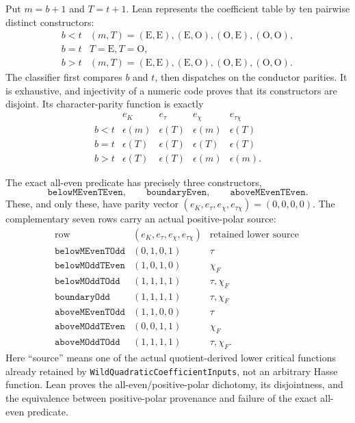 \begin{definition}\label{mod:cases-wildquadratic-coefficienttable}
Put \(m=b+1\) and \(T=t+1\).  Lean represents the coefficient table by ten
pairwise distinct constructors:
\[
\begin{array}{c|c}
b<t&(m,T)=(\mathrm E,\mathrm E),(\mathrm E,\mathrm O),
       (\mathrm O,\mathrm E),(\mathrm O,\mathrm O),\\
b=t&T=\mathrm E,T=\mathrm O,\\
b>t&(m,T)=(\mathrm E,\mathrm E),(\mathrm E,\mathrm O),
       (\mathrm O,\mathrm E),(\mathrm O,\mathrm O).
\end{array}
\]
The classifier first compares \(b\) and \(t\), then dispatches on the
conductor parities.  It is exhaustive, and injectivity of a numeric code
proves that its constructors are disjoint.  Its character-parity function is
exactly
\[
\begin{array}{c|cccc}
 &e_K&e_\tau&e_\chi&e_{\tau\chi}\\ \hline
b<t&\epsilon(m)&\epsilon(T)&\epsilon(m)&\epsilon(T)\\
b=t&\epsilon(T)&\epsilon(T)&\epsilon(T)&\epsilon(T)\\
b>t&\epsilon(T)&\epsilon(T)&\epsilon(m)&\epsilon(m).
\end{array}
\]

The exact all-even predicate has precisely three constructors,
\[
 \texttt{belowMEvenTEven},\qquad
 \texttt{boundaryEven},\qquad
 \texttt{aboveMEvenTEven}.
\]
These, and only these, have parity vector
\((e_K,e_\tau,e_\chi,e_{\tau\chi})=(0,0,0,0)\).  The complementary seven
rows carry an actual positive-polar source:
\[
\begin{array}{c|c|c}
\text{row}&(e_K,e_\tau,e_\chi,e_{\tau\chi})&
  \text{retained lower source}\ \\ \hline
\texttt{belowMEvenTOdd}&(0,1,0,1)&\tau\\
\texttt{belowMOddTEven}&(1,0,1,0)&\chi_F\\
\texttt{belowMOddTOdd}&(1,1,1,1)&\tau,\chi_F\\
\texttt{boundaryOdd}&(1,1,1,1)&\tau,\chi_F\\
\texttt{aboveMEvenTOdd}&(1,1,0,0)&\tau\\
\texttt{aboveMOddTEven}&(0,0,1,1)&\chi_F\\
\texttt{aboveMOddTOdd}&(1,1,1,1)&\tau,\chi_F.
\end{array}
\]
Here ``source'' means one of the actual quotient-derived lower critical
functions already retained by \texttt{WildQuadraticCoefficientInputs}, not
an arbitrary Hasse function.  Lean proves the all-even/positive-polar
dichotomy, its disjointness, and the equivalence between positive-polar
provenance and failure of the exact all-even predicate.


\end{definition}
